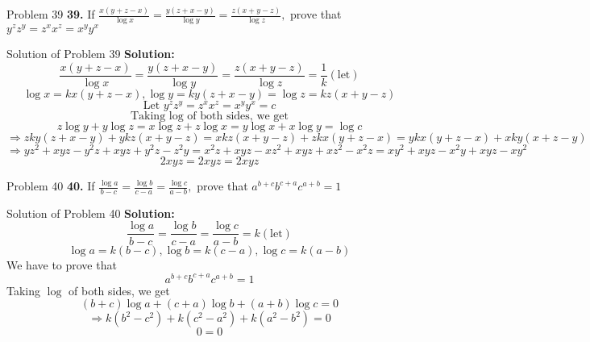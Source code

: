 \documentclass[aspectratio=1610,8pt]{beamer}
\begin{document}
\begin{frame}{Problem 39}
  \textbf{39.} If $\frac{x(y + z - x)}{\log x} = \frac{y(z + x - y)}{\log y} = \frac{z(x + y - z)}{\log z},$ prove that $y^zz^y = z^xx^z = x^yy^x$
\end{frame}
\begin{frame}{Solution of Problem 39}
  \textbf{Solution:} $$\frac{x(y + z - x)}{\log x} = \frac{y(z + x - y)}{\log y} = \frac{z(x + y - z)}{\log z} = \frac{1}{k}(\text{let})$$
  $$\log x = kx(y + z - x), \log y = ky(z + x - y) = \log z = kz(x + y - z)$$
  $$\text{Let~}y^zz^y = z^xx^z = x^yy^x = c$$
  $$\text{Taking~}\log\text{~of both sides, we get}$$
  $$z\log y + y\log z = x\log z + z\log x = y\log x + x\log y = \log c$$
  $$\Rightarrow zky(z + x - y) + ykz(x + y - z) = xkz(x + y - z) + zkx(y + z - x) = ykx(y + z - x) + xky(x + z - y)$$
  $$\Rightarrow yz^2 + xyz - y^2z + xyz + y^2z - z^2y = x^2z + xyz - xz^2 + xyz + xz^2 - x^2z = xy^2 + xyz - x^2y + xyz - xy^2$$
  $$2xyz = 2xyz = 2xyz$$
\end{frame}
\begin{frame}{Problem 40}
  \textbf{40.} If $\frac{\log a}{b - c} = \frac{\log b}{c - a} = \frac{\log c}{a - b},$ prove that $a^{b + c}b^{c + a}c^{a + b} = 1$
\end{frame}
\begin{frame}{Solution of Problem 40}
  \textbf{Solution:} $$\frac{\log a}{b - c} = \frac{\log b}{c - a} = \frac{\log c}{a - b} = k(\text{let})$$
  $$\log a = k(b - c), \log b = k(c - a), \log c = k(a - b)$$
  We have to prove that $$a^{b + c}b^{c + a}c^{a + b} = 1$$
  Taking $\log$ of both sides, we get
  $$(b + c)\log a + (c + a)\log b + (a + b)\log c = 0$$
  $$\Rightarrow k(b^2 - c^2) + k(c^2 - a^2) + k(a^2 - b^2) = 0$$
  $$0 = 0$$
\end{frame}
\end{document}
